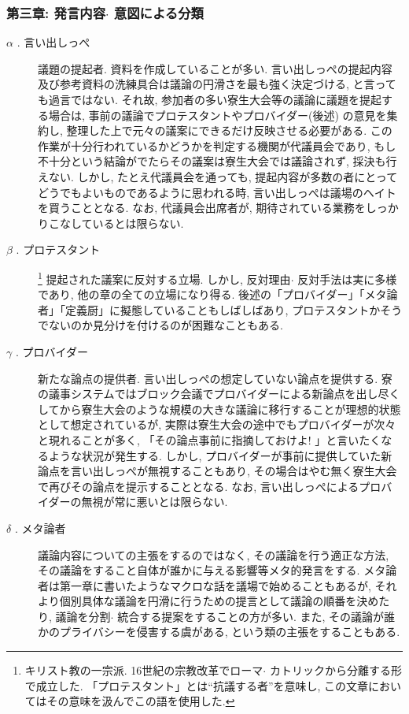 \documentclass[10pt,b5jsbook,dvips,dvipdfmx,openany]{jsbook}
\theoremstyle{definition}
\begin{document}
			\subsubsection{第三章: 発言内容$ \cdot $ 意図による分類}
			\begin{description}

			\item[$ \alpha $ . 言い出しっぺ]

			議題の提起者. 資料を作成していることが多い. 言い出しっぺの提起内容及び参考資料の洗練具合は議論の円滑さを最も強く決定づける, と言っても過言ではない. それ故, 参加者の多い寮生大会等の議論に議題を提起する場合は, 事前の議論でプロテスタントやプロバイダー(後述) の意見を集約し, 整理した上で元々の議案にできるだけ反映させる必要がある. この作業が十分行われているかどうかを判定する機関が代議員会であり, もし不十分という結論がでたらその議案は寮生大会では議論されず, 採決も行えない. しかし, たとえ代議員会を通っても, 提起内容が多数の者にとってどうでもよいものであるように思われる時, 言い出しっぺは議場のヘイトを買うこととなる. なお, 代議員会出席者が, 期待されている業務をしっかりこなしているとは限らない.

			\item[$ \beta $ . プロテスタント]  \footnote{キリスト教の一宗派. 16世紀の宗教改革でローマ$ \cdot $ カトリックから分離する形で成立した. 「プロテスタント」とは``抗議する者''を意味し, この文章においてはその意味を汲んでこの語を使用した. }
提起された議案に反対する立場. しかし, 反対理由$ \cdot $ 反対手法は実に多様であり, 他の章の全ての立場になり得る. 後述の「プロバイダー」「メタ論者」「定義厨」に擬態していることもしばしばあり, プロテスタントかそうでないのか見分けを付けるのが困難なこともある.


			\item[$ \gamma $ . プロバイダー]

			新たな論点の提供者. 言い出しっぺの想定していない論点を提供する. 寮の議事システムではブロック会議でプロバイダーによる新論点を出し尽くしてから寮生大会のような規模の大きな議論に移行することが理想的状態として想定されているが, 実際は寮生大会の途中でもプロバイダーが次々と現れることが多く, 「その論点事前に指摘しておけよ! 」と言いたくなるような状況が発生する. しかし, プロバイダーが事前に提供していた新論点を言い出しっぺが無視することもあり, その場合はやむ無く寮生大会で再びその論点を提示することとなる. なお, 言い出しっぺによるプロバイダーの無視が常に悪いとは限らない.


			\item[$ \delta $ . メタ論者]

			議論内容についての主張をするのではなく, その議論を行う適正な方法, その議論をすること自体が誰かに与える影響等メタ的発言をする.
メタ論者は第一章に書いたようなマクロな話を議場で始めることもあるが, それより個別具体な議論を円滑に行うための提言として議論の順番を決めたり, 議論を分割$ \cdot $ 統合する提案をすることの方が多い. また, その議論が誰かのプライバシーを侵害する虞がある, という類の主張をすることもある.


\end{description}
\end{document}
